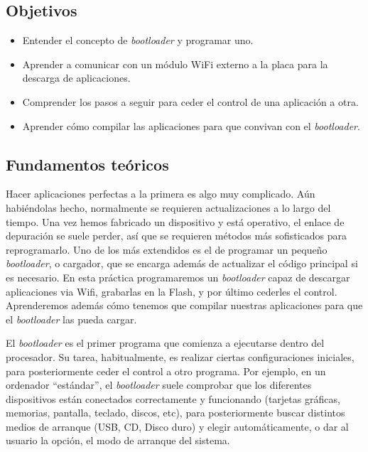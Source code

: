 \documentclass[../main.tex]{subfiles}
\begin{document}

    \subsection{Objetivos}
        \begin{itemize}
            \item Entender el concepto de \emph{bootloader} y programar uno.
            \item Aprender a comunicar con un módulo WiFi externo a la placa para la descarga de aplicaciones.
            \item Comprender los pasos a seguir para ceder el control de una aplicación a otra.
            \item Aprender cómo compilar las aplicaciones para que convivan con el \emph{bootloader}.
        \end{itemize}

    \subsection{Fundamentos teóricos}

        Hacer aplicaciones perfectas a la primera es algo muy complicado. Aún habiéndolas hecho, normalmente se requieren actualizaciones a lo largo del tiempo. Una vez hemos fabricado un dispositivo y está operativo, el enlace de depuración se suele perder, así que se requieren métodos más sofisticados para reprogramarlo. Uno de los más extendidos es el de programar un pequeño \emph{bootloader}, o cargador, que se encarga además de actualizar el código principal si es necesario. En esta práctica programaremos un \emph{bootloader} capaz de descargar aplicaciones via Wifi, grabarlas en la Flash, y por último cederles el control. Aprenderemos además cómo tenemos que compilar nuestras aplicaciones para que el \emph{bootloader} las pueda cargar.


        El \emph{bootloader} es el primer programa que comienza a ejecutarse dentro del procesador. Su tarea, habitualmente, es realizar ciertas configuraciones iniciales, para posteriormente ceder el control a otro programa. Por ejemplo, en un ordenador ``estándar'', el \emph{bootloader} suele comprobar que los diferentes dispositivos están conectados correctamente y funcionando (tarjetas gráficas, memorias, pantalla, teclado, discos, etc), para posteriormente buscar distintos medios de arranque (USB, CD, Disco duro) y elegir automáticamente, o dar al usuario la opción, el modo de arranque del sistema.
\end{document}

